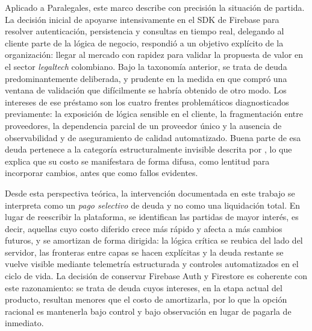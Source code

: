 Aplicado a Paralegales, este marco describe con precisión la situación de partida. La decisión inicial de apoyarse intensivamente en el SDK de Firebase para resolver autenticación, persistencia y consultas en tiempo real, delegando al cliente parte de la lógica de negocio, respondió a un objetivo explícito de la organización: llegar al mercado con rapidez para validar la propuesta de valor en el sector \textit{legaltech} colombiano. Bajo la taxonomía anterior, se trata de deuda predominantemente deliberada, y prudente en la medida en que compró una ventana de validación que difícilmente se habría obtenido de otro modo. Los intereses de ese préstamo son los cuatro frentes problemáticos diagnosticados previamente: la exposición de lógica sensible en el cliente, la fragmentación entre proveedores, la dependencia parcial de un proveedor único y la ausencia de observabilidad y de aseguramiento de calidad automatizado. Buena parte de esa deuda pertenece a la categoría estructuralmente invisible descrita por \textcite{Kruchten2012}, lo que explica que su costo se manifestara de forma difusa, como lentitud para incorporar cambios, antes que como fallos evidentes.

Desde esta perspectiva teórica, la intervención documentada en este trabajo se interpreta como un \textit{pago selectivo} de deuda y no como una liquidación total. En lugar de reescribir la plataforma, se identifican las partidas de mayor interés, es decir, aquellas cuyo costo diferido crece más rápido y afecta a más cambios futuros, y se amortizan de forma dirigida: la lógica crítica se reubica del lado del servidor, las fronteras entre capas se hacen explícitas y la deuda restante se vuelve visible mediante telemetría estructurada y controles automatizados en el ciclo de vida. La decisión de conservar Firebase Auth y Firestore es coherente con este razonamiento: se trata de deuda cuyos intereses, en la etapa actual del producto, resultan menores que el costo de amortizarla, por lo que la opción racional es mantenerla bajo control y bajo observación en lugar de pagarla de inmediato.
